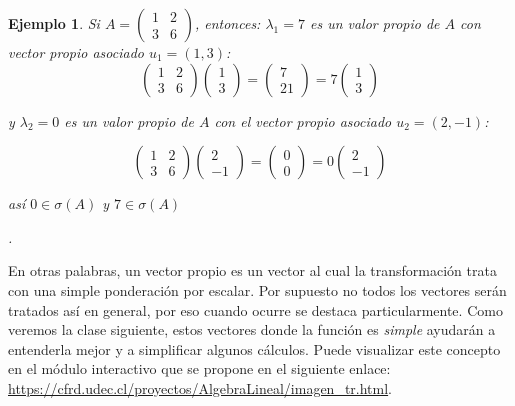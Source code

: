 \documentclass[12pt]{book}
\newtheorem{ejem}{Ejemplo}
\begin{document}
\begin{ejem} {\em Si $A=\left(\begin{matrix}1 & 2\\ 3 & 6 \end{matrix}\right)$, entonces: $\lambda_1=7$ es un valor propio de $A$ con vector propio asociado $u_1=(1,3)$:
$$\left(\begin{matrix}1 & 2\\ 3 & 6 \end{matrix}\right)\left(\begin{matrix}1 \\ 3  \end{matrix}\right)=\left(\begin{matrix}7 \\ 21  \end{matrix}\right)=7\left(\begin{matrix}1 \\ 3  \end{matrix}\right)$$

 y $\lambda_2=0$ es un valor propio de $A$ con el vector propio asociado $u_2=(2,-1)$:
 
$$\left(\begin{matrix}1 & 2\\ 3 & 6 \end{matrix}\right)\left(\begin{matrix}2 \\ -1  \end{matrix}\right)=\left(\begin{matrix}0 \\ 0  \end{matrix}\right)=0\left(\begin{matrix}2 \\ -1  \end{matrix}\right)$$ 
 
 así $0 \in \sigma(A)$ y $7 \in \sigma(A)$}.\end{ejem}
 
 \vspace{0.2 cm}

En otras palabras, un vector propio es un vector al cual la transformación trata con una simple ponderación por escalar.
Por supuesto no todos los vectores serán tratados así en general, por eso cuando ocurre se destaca particularmente.
Como veremos la clase siguiente, estos vectores donde la función es \emph{simple} ayudarán a entenderla mejor y a simplificar algunos cálculos.
Puede visualizar este concepto en el módulo interactivo que se propone en el siguiente enlace: \url{https://cfrd.udec.cl/proyectos/AlgebraLineal/imagen_tr.html}.
\end{document}
